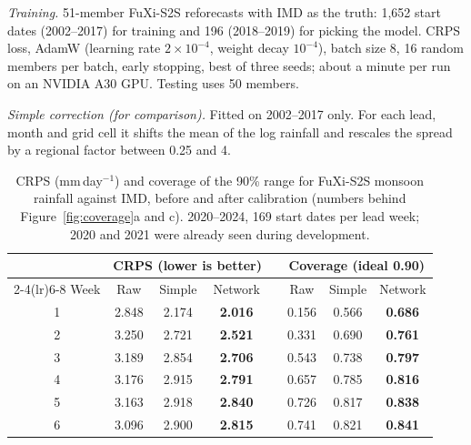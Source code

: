 \documentclass[11pt,a4paper]{article}
\begin{document}
\textit{Training.} 51-member FuXi-S2S reforecasts with IMD as the truth: 1,652 start dates (2002--2017) for training and 196
(2018--2019) for picking the model. CRPS loss, AdamW (learning rate $2\times10^{-4}$, weight decay $10^{-4}$), batch size 8, 16
random members per batch, early stopping, best of three seeds; about a minute per run on an NVIDIA A30 GPU. Testing uses 50 members.

\textit{Simple correction (for comparison).} Fitted on 2002--2017 only. For each lead, month and grid cell it shifts the mean of the
log rainfall and rescales the spread by a regional factor between 0.25 and 4.

\begin{table}[H]
\centering\footnotesize
\caption{CRPS (mm\,day$^{-1}$) and coverage of the 90\% range for FuXi-S2S monsoon rainfall against IMD, before and after
calibration (numbers behind Figure~\ref{fig:coverage}a and c). 2020--2024, 169 start dates per lead week; 2020 and 2021 were
already seen during development.}
\label{tab:leadwise}
\setlength{\tabcolsep}{6pt}
\begin{tabular}{@{}c ccc c ccc@{}}
\toprule
 & \multicolumn{3}{c}{CRPS (lower is better)} & & \multicolumn{3}{c}{Coverage (ideal 0.90)} \\
\cmidrule(lr){2-4}\cmidrule(lr){6-8}
Week & Raw & Simple & Network & & Raw & Simple & Network \\
\midrule
1 & 2.848 & 2.174 & \textbf{2.016} & & 0.156 & 0.566 & \textbf{0.686} \\
2 & 3.250 & 2.721 & \textbf{2.521} & & 0.331 & 0.690 & \textbf{0.761} \\
3 & 3.189 & 2.854 & \textbf{2.706} & & 0.543 & 0.738 & \textbf{0.797} \\
4 & 3.176 & 2.915 & \textbf{2.791} & & 0.657 & 0.785 & \textbf{0.816} \\
5 & 3.163 & 2.918 & \textbf{2.840} & & 0.726 & 0.817 & \textbf{0.838} \\
6 & 3.096 & 2.900 & \textbf{2.815} & & 0.741 & 0.821 & \textbf{0.841} \\
\bottomrule
\end{tabular}
\end{table}
\end{document}
